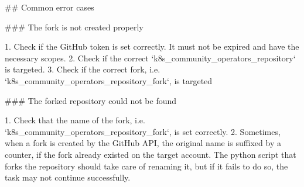 ## Common error cases

### The fork is not created properly

1. Check if the GitHub token is set correctly. It must not be expired and have the necessary scopes.
2. Check if the correct `k8s_community_operators_repository` is targeted.
3. Check if the correct fork, i.e. `k8s_community_operators_repository_fork`, is targeted

### The forked repository could not be found

1. Check that the name of the fork, i.e. `k8s_community_operators_repository_fork`, is set correctly.
2. Sometimes, when a fork is created by the GitHub API, the original name is suffixed by a counter, if the fork already existed on the target account.
   The python script that forks the repository should take care of renaming it, but if it fails to do so, the task may not continue successfully.
